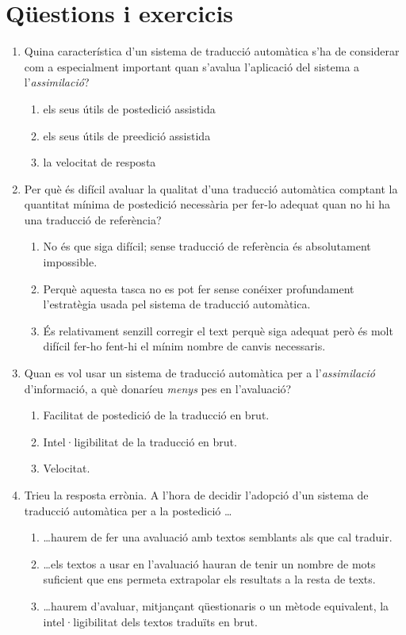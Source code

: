 \section{Qüestions i exercicis}

\begin{enumerate}
\item Quina característica d'un sistema de traducció automàtica
   s'ha de considerar com a especialment important quan s'avalua
   l'aplicació del sistema a l'\emph{assimilació}?
   
\begin{enumerate}
\item els seus útils de postedició assistida
\item els seus útils de preedició assistida
\item la velocitat de resposta
\end{enumerate}

\item Per què és difícil avaluar la qualitat d'una traducció automàtica
   comptant la quantitat mínima de postedició necessària per fer-lo adequat
   quan no hi ha una traducció de referència?
   
\begin{enumerate}
\item No és que siga difícil; sense
      traducció de referència és absolutament impossible.
\item Perquè aquesta tasca no es pot fer sense conéixer
      profundament l'estratègia usada pel sistema de traducció
      automàtica.
\item És relativament senzill corregir el text perquè
      siga adequat però és molt difícil fer-ho fent-hi el mínim nombre
      de canvis necessaris.
\end{enumerate}

\item Quan es vol usar un sistema de traducció automàtica per a
  l'\emph{assimilació} d'informació, a què donaríeu \emph{menys} pes
  en l'avaluació?
   
\begin{enumerate}
\item Facilitat de postedició de la traducció en brut.
\item Intel·ligibilitat de la traducció en brut.
\item Velocitat.
\end{enumerate}

\item Trieu la resposta errònia. A l'hora de decidir l'adopció d'un sistema de traducció automàtica per a la  postedició \ldots
  \begin{enumerate}
  \item \ldots haurem de fer una avaluació amb textos semblants als que cal traduir.
  \item \ldots els textos a usar en l'avaluació hauran de tenir un nombre de mots suficient que ens permeta extrapolar els resultats a la resta de texts.
  \item \ldots haurem d'avaluar, mitjançant qüestionaris o un mètode equivalent, la intel·ligibilitat dels textos traduïts en brut.
  \end{enumerate}



\end{enumerate}
